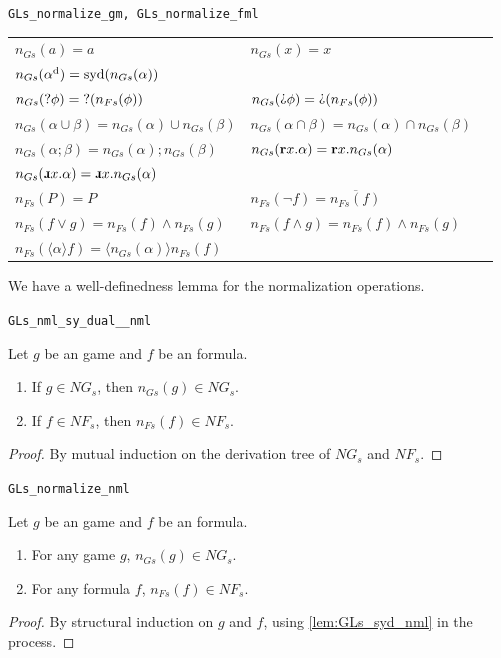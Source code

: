 \begin{bdefinition}
\texttt{GLs\_normalize\_gm, GLs\_normalize\_fml}

\begin{tabular}{l l l}
  $n_{Gs}(a)=a$ 
  & $n_{Gs}(x)=x$ \\
    $n_{Gs}(\alpha^\text{d})= \operatorname{syd}(n_{Gs}(\alpha))$ \\
   $n_{Gs}(\text{?} \phi)= \text{?}(n_{Fs}(\phi))$ 
   & $n_{Gs}(\DTest \phi)= \DTest(n_{Fs}(\phi))$ \\
   $n_{Gs}(\alpha\cup\beta)=n_{Gs}(\alpha)\cup n_{Gs}(\beta)$ 
   & $n_{Gs}(\alpha\cap\beta)=n_{Gs}(\alpha)\cap n_{Gs}(\beta)$ \\
   $n_{Gs}(\alpha ; \beta) = n_{Gs}(\alpha);n_{Gs}(\beta)$
   & $n_{Gs}(\textbf{r} x.\alpha)= \textbf{r} x.n_{Gs}(\alpha)$ \\
   $n_{Gs}(\DRec x.\alpha)= \DRec x.n_{Gs}(\alpha)$ \\
   $n_{Fs}(P) = P$
   & $n_{Fs}(\neg f) = \overline{n_{Fs}(f)}$ \\
    $n_{Fs}(f\vee g) = n_{Fs}(f)\wedge n_{Fs}(g)$ 
   & $n_{Fs}(f\wedge g) = n_{Fs}(f)\wedge n_{Fs}(g)$ \\
   $n_{Fs}(\langle\alpha\rangle f) = \langle n_{Gs}(\alpha)\rangle n_{Fs}(f)$
\end{tabular}
\end{bdefinition}

We have a well-definedness lemma for the normalization operations.

\begin{blemma} \texttt{GLs\_nml\_sy\_dual\_\_nml}
\label{lem:GLs_syd_nml}

Let $g$ be an \GLs{} game and $f$ be an \GLs{} formula.

\begin{enumerate} 
    \item If $g\in NG_s$, then $n_{Gs}(g)\in NG_s$.
    \item If $f\in NF_s$, then $n_{Fs}(f)\in NF_s$.
\end{enumerate}
\end{blemma}
\begin{proof}
By mutual induction on the derivation tree of $NG_s$ and $NF_s$.
\end{proof}

\begin{blemma} \texttt{GLs\_normalize\_nml}

Let $g$ be an \GLs{} game and $f$ be an \GLs{} formula.
\label{lem:GLs_normalize_nml}
\begin{enumerate} 
    \item For any \GLs{} game $g$, $n_{Gs}(g)\in NG_s$.
    \item For any \GLs{} formula $f$, $n_{Fs}(f)\in NF_s$.
\end{enumerate}
\end{blemma}
\begin{proof}
    By structural induction on $g$ and $f$, using \autoref{lem:GLs_syd_nml} in the process.
\end{proof}

